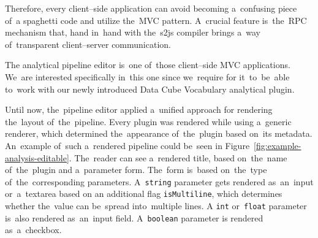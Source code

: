 Therefore, every client--side application can avoid becoming a~confusing piece of~a
spaghetti code and utilize the~MVC pattern. A~crucial feature is~the~RPC 
mechanism that, hand in~hand with the~s2js compiler brings a~way of~transparent 
client--server communication.

The analytical pipeline editor is~one of~those client--side MVC applications. We~are interested specifically in~this one since we~require for it~to~be~able to~work 
with our newly introduced Data Cube Vocabulary analytical plugin.

Until now, the~pipeline editor applied a~unified approach for rendering the~layout of~the~pipeline. Every plugin was rendered while using a~generic 
renderer, which determined the~appearance of~the~plugin based on~its metadata. An~example of~such a~rendered pipeline could be~seen in
Figure~\ref{fig:example-analysis-editable}. The~reader can see a~rendered title, based on~the~name of~the~plugin and a~parameter form. The~form is~based on~the~type of~the~corresponding parameters. A~\texttt{string} parameter gets rendered as~an~input or~a~textarea based on
an additional flag \texttt{isMultiline}, which determines whether the~value can be~spread into~multiple lines.
A \texttt{int} or~\texttt{float} parameter is~also rendered as~an~input field. A~\texttt{boolean} parameter 
is rendered as~a~checkbox.

